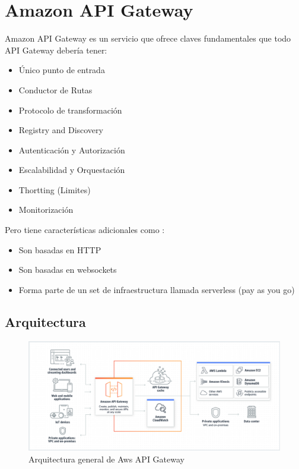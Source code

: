 \section{Amazon API Gateway}

Amazon API Gateway \cite{aws-api-gateway-docs} es un servicio que ofrece claves fundamentales que todo API Gateway debería tener: \
\begin{itemize}
	\item Único punto de entrada
	\item Conductor de Rutas
	\item Protocolo de transformación
	\item Registry and Discovery
	\item Autenticación y Autorización
	\item Escalabilidad y Orquestación
	\item Thortting (Limites)
	\item Monitorización
\end{itemize}

Pero tiene características adicionales como : \

\begin{itemize}
	\item Son basadas en HTTP
	\item Son basadas en websockets
	\item Forma parte de un set de infraestructura llamada serverless (pay as you go)
\end{itemize}
\subsection{Arquitectura}
\begin{figure}[htbp]
	\centering
	\includegraphics[width=\columnwidth]{images/architecture_aws_api_gateway}
	\caption{Arquitectura general de Aws API Gateway}
	\label{fig:architecture_aws_api_gateway}
\end{figure}

